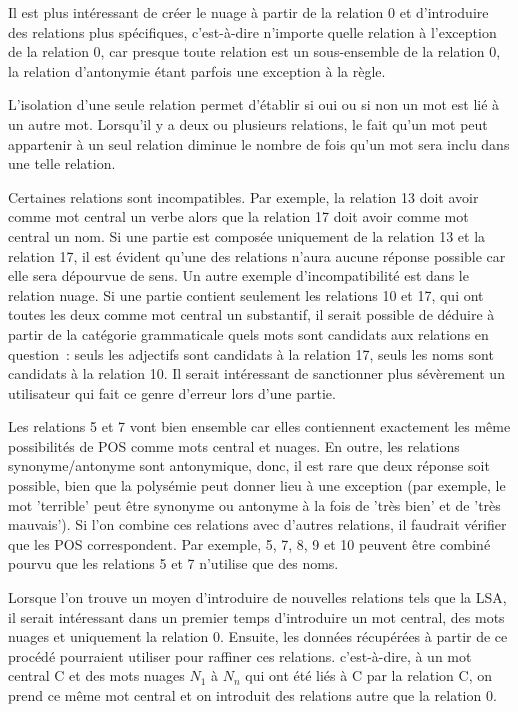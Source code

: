 \documentclass[a4paper,11pt,french]{article}
\begin{document}
Il est plus intéressant de créer le nuage à partir de la relation 0 et d'introduire des relations plus spécifiques, c'est-à-dire n'importe quelle relation à l'exception de la relation 0, car presque toute relation est un sous-ensemble de la relation 0, la relation d'antonymie étant parfois une exception à la règle. 

L'isolation d'une seule relation permet d'établir si oui ou si non un mot est lié à un autre mot. Lorsqu'il y a deux ou plusieurs relations, le fait qu'un mot peut appartenir à un seul relation diminue le nombre de fois qu'un mot sera inclu dans une telle relation. 

Certaines relations sont incompatibles. Par exemple, la relation 13 doit avoir comme mot central un verbe alors que la relation 17 doit avoir comme mot central un nom. Si une partie est composée uniquement de la relation 13 et la relation 17, il est évident qu'une des relations n'aura aucune réponse possible car elle sera dépourvue de sens. Un autre exemple d'incompatibilité est dans le relation nuage. Si une partie contient seulement les relations 10 et 17, qui ont toutes les deux comme mot central un substantif, il serait possible de déduire à partir de la catégorie grammaticale quels mots sont candidats aux relations en question~: seuls les adjectifs sont candidats à la relation 17, seuls les noms sont candidats à la relation 10. Il serait intéressant de sanctionner plus sévèrement un utilisateur qui fait ce genre d'erreur lors d'une partie. 

Les relations 5 et 7 vont bien ensemble car elles contiennent exactement les même possibilités de POS comme mots central et nuages. En outre, les relations synonyme/antonyme sont antonymique, donc, il est rare que deux réponse soit possible, bien que la polysémie peut donner lieu à une exception (par exemple, le mot 'terrible' peut être synonyme ou antonyme à la fois de 'très bien' et de 'très mauvais'). Si l'on combine ces relations avec d'autres relations, il faudrait vérifier que les POS correspondent. Par exemple, 5, 7, 8, 9 et 10 peuvent être combiné pourvu que les relations 5 et 7 n'utilise que des noms.

Lorsque l'on trouve un moyen d'introduire de nouvelles relations tels que la LSA, il serait intéressant dans un premier temps d'introduire un mot central, des mots nuages et uniquement la relation 0. Ensuite, les données récupérées à partir de ce procédé pourraient utiliser pour raffiner ces relations. c'est-à-dire, à un mot central C et des mots nuages $N_{1}$ à $N_{n}$ qui ont été liés à C par la relation C, on prend ce même mot central et on introduit des relations autre que la relation 0. 
\end{document}
